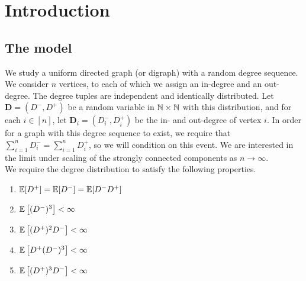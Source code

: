 \section{Introduction}


\subsection{The model}
We study a uniform directed graph (or digraph) with a random degree sequence. We consider $n$ vertices, to each of which we assign an in-degree and an out-degree. The degree tuples are independent and identically distributed. Let $\mathbf{D}=(D^-,D^+)$ be a random variable in ${\mathbb N}\times {\mathbb N}$ with this distribution, and for each $i\in [n]$, let $\mathbf{D}_i=(D^-_i,D^+_i)$  be the in- and out-degree of vertex $i$. In order for a graph with this degree sequence to exist, we require that $\sum_{i=1}^n D^-_i=\sum_{i=1}^n D^+_i$, so we will condition on this event. We are interested in the limit under scaling of the strongly connected components as $n\to \infty$.  \\

We require the degree distribution to satisfy the following properties. 


\begin{enumerate}
    \item \label{cond.mu}${\mathbb E}[D^+]={\mathbb E}[D^-]={\mathbb E}[D^-D^+]$
     \item \label{cond.gamma}${\mathbb E}\left[(D^-)^3\right]<\infty$
    \item \label{cond.rho} ${\mathbb E}\left[(D^+)^2 D^-\right]<\infty$
      \item \label{cond.iota} ${\mathbb E}\left[D^+(D^-)^3\right]<\infty$
      \item ${\mathbb E}\left[(D^+)^3D^-\right]<\infty$
\end{enumerate}

